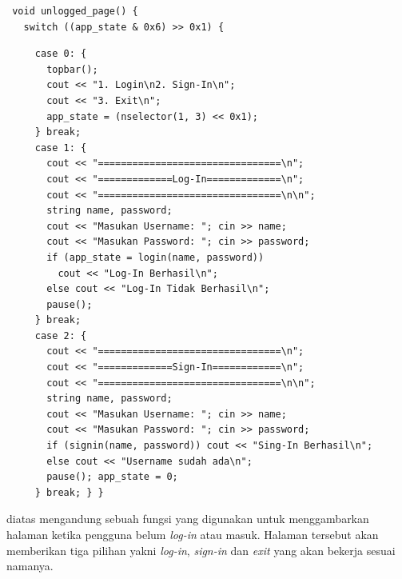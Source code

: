 \documentclass[../main.tex]{subfiles}
\begin{document}
\begin{lstlisting}
 void unlogged_page() {
   switch ((app_state & 0x6) >> 0x1) {
\end{lstlisting}
\begin{lstlisting}
     case 0: {
       topbar();
       cout << "1. Login\n2. Sign-In\n";
       cout << "3. Exit\n";
       app_state = (nselector(1, 3) << 0x1);
     } break;
     case 1: {
       cout << "================================\n";
       cout << "=============Log-In=============\n";
       cout << "================================\n\n";
       string name, password;
       cout << "Masukan Username: "; cin >> name;
       cout << "Masukan Password: "; cin >> password;
       if (app_state = login(name, password))
         cout << "Log-In Berhasil\n";
       else cout << "Log-In Tidak Berhasil\n";
       pause();
     } break;
     case 2: {
       cout << "================================\n";
       cout << "=============Sign-In============\n";
       cout << "================================\n\n";
       string name, password;
       cout << "Masukan Username: "; cin >> name;
       cout << "Masukan Password: "; cin >> password;
       if (signin(name, password)) cout << "Sing-In Berhasil\n";
       else cout << "Username sudah ada\n";
       pause(); app_state = 0;
     } break; } }
\end{lstlisting}
    \ilz{}{\Script} diatas mengandung sebuah fungsi yang digunakan untuk menggambarkan halaman ketika pengguna belum \textit{log-in} atau masuk. Halaman tersebut akan memberikan tiga pilihan yakni \textit{log-in}, \textit{sign-in} dan \textit{exit} yang akan bekerja sesuai namanya.
\end{document}
